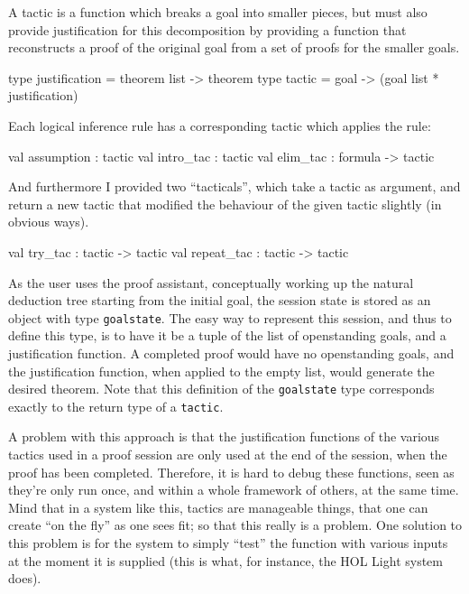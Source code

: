 \documentclass[a4paper,11pt]{article} %
\begin{document}
A tactic is a function which breaks a goal into smaller pieces, but must also provide justification for this decomposition by providing a function that reconstructs a proof of the original goal from a set of proofs for the smaller goals.

\begin{ocamlcode}
  type justification = theorem list -> theorem
  type tactic = goal -> (goal list * justification)
\end{ocamlcode}

Each logical inference rule has a corresponding tactic which applies the rule:

\begin{ocamlcode}
  val assumption : tactic
  val intro_tac : tactic
  val elim_tac : formula -> tactic
\end{ocamlcode}

And furthermore I provided two “tacticals”, which take a tactic as argument, and return a new tactic that modified the behaviour of the given tactic slightly (in obvious ways).

\begin{ocamlcode}
  val try_tac : tactic -> tactic
  val repeat_tac : tactic -> tactic
\end{ocamlcode}

As the user uses the proof assistant, conceptually working up the natural deduction tree starting from the initial goal, the session state is stored as an object with type \texttt{goalstate}. The easy way to represent this session, and thus to define this type, is to have it be a tuple of the list of openstanding goals, and a justification function. A completed proof would have no openstanding goals, and the justification function, when applied to the empty list, would generate the desired theorem. Note that this definition of the \texttt{goalstate} type corresponds exactly to the return type of a \texttt{tactic}.

A problem with this approach is that the justification functions of the various tactics used in a proof session are only used at the end of the session, when the proof has been completed. Therefore, it is hard to debug these functions, seen as they're only run once, and within a whole framework of others, at the same time. Mind that in a system like this, tactics are manageable things, that one can create “on the fly” as one sees fit; so that this really is a problem. One solution to this problem is for the system to simply “test” the function with various inputs at the moment it is supplied (this is what, for instance, the HOL Light system does).
\end{document}
